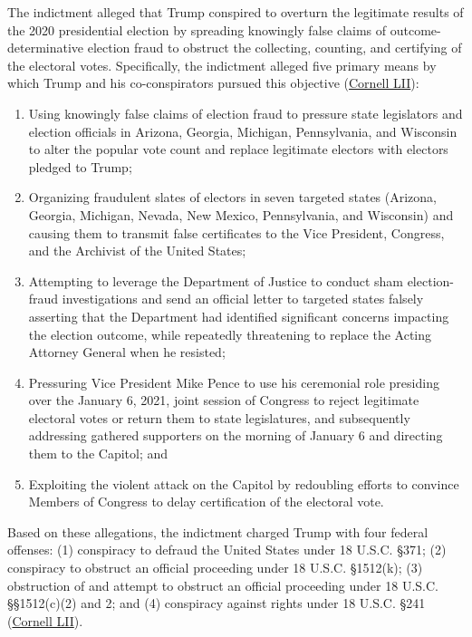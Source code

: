 \documentclass[12pt]{article}
\begin{document}
The indictment alleged that Trump conspired to overturn the legitimate results of the 2020 presidential election by spreading knowingly false claims of outcome-determinative election fraud to obstruct the collecting, counting, and certifying of the electoral votes. Specifically, the indictment alleged five primary means by which Trump and his co-conspirators pursued this objective (\href{https://www.law.cornell.edu/supremecourt/text/23-939}{Cornell LII}):
\begin{enumerate}
\item Using knowingly false claims of election fraud to pressure state legislators and election officials in Arizona, Georgia, Michigan, Pennsylvania, and Wisconsin to alter the popular vote count and replace legitimate electors with electors pledged to Trump;
\item Organizing fraudulent slates of electors in seven targeted states (Arizona, Georgia, Michigan, Nevada, New Mexico, Pennsylvania, and Wisconsin) and causing them to transmit false certificates to the Vice President, Congress, and the Archivist of the United States;
\item Attempting to leverage the Department of Justice to conduct sham election-fraud investigations and send an official letter to targeted states falsely asserting that the Department had identified significant concerns impacting the election outcome, while repeatedly threatening to replace the Acting Attorney General when he resisted;
\item Pressuring Vice President Mike Pence to use his ceremonial role presiding over the January 6, 2021, joint session of Congress to reject legitimate electoral votes or return them to state legislatures, and subsequently addressing gathered supporters on the morning of January 6 and directing them to the Capitol; and
\item Exploiting the violent attack on the Capitol by redoubling efforts to convince Members of Congress to delay certification of the electoral vote.
\end{enumerate}

Based on these allegations, the indictment charged Trump with four federal offenses: (1) conspiracy to defraud the United States under 18 U.S.C. \S 371; (2) conspiracy to obstruct an official proceeding under 18 U.S.C. \S 1512(k); (3) obstruction of and attempt to obstruct an official proceeding under 18 U.S.C. \S\S 1512(c)(2) and 2; and (4) conspiracy against rights under 18 U.S.C. \S 241 (\href{https://www.law.cornell.edu/supremecourt/text/23-939}{Cornell LII}).
\end{document}
